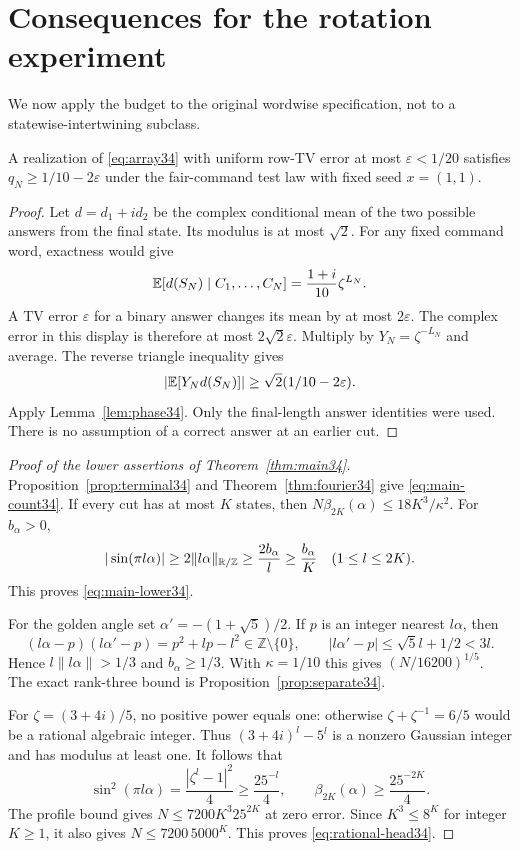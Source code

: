 \section{Consequences for the rotation experiment}\label{sec:rotation34}
We now apply the budget to the original wordwise specification, not to a
statewise-intertwining subclass.

\begin{proposition}\label{prop:terminal34}
A realization of \eqref{eq:array34} with uniform row-TV error at most
$\varepsilon<1/20$ satisfies $q_N\ge1/10-2\varepsilon$ under the fair-command
test law with fixed seed $x=(1,1)$.
\end{proposition}
\begin{proof}
Let $d=d_1+i d_2$ be the complex conditional mean of the two possible
answers from the final state. Its modulus is at most $\sqrt2$. For any
fixed command word, exactness would give
\[
 \mathbb E[d(S_N)\mid C_1,\ldots,C_N]
                  =\frac{1+i}{10}\zeta^{L_N}.
\]
A TV error $\varepsilon$ for a binary answer changes its mean by at most
$2\varepsilon$. The complex error in this display is therefore at most
$2\sqrt2\varepsilon$. Multiply by $Y_N=\zeta^{-L_N}$ and average. The reverse
triangle inequality gives
\[
 |\mathbb E[Y_Nd(S_N)]|\ge\sqrt2(1/10-2\varepsilon).
\]
Apply Lemma~\ref{lem:phase34}. Only the final-length answer identities
were used. There is no assumption of a correct answer at an earlier cut.
\end{proof}

\begin{proof}[Proof of the lower assertions of Theorem~\ref{thm:main34}]
Proposition~\ref{prop:terminal34} and Theorem~\ref{thm:fourier34} give
\eqref{eq:main-count34}. If every cut has at most $K$ states, then
$N\beta_{2K}(\alpha)\le18K^3/\kappa^2$. For $b_\alpha>0$,
\[
 |\sin(\pi l\alpha)|\ge2\|l\alpha\|_{\mathbb R/\mathbb Z}
          \ge\frac{2b_\alpha}{l}\ge\frac{b_\alpha}{K}
          \quad(1\le l\le2K).
\]
This proves \eqref{eq:main-lower34}.

For the golden angle set $\alpha'=-(1+\sqrt5)/2$. If $p$ is an integer
nearest $l\alpha$, then
\[
 (l\alpha-p)(l\alpha'-p)=p^2+lp-l^2\in\mathbb Z\setminus\{0\},
 \qquad |l\alpha'-p|\le\sqrt5l+1/2<3l.
\]
Hence $l\|l\alpha\|>1/3$ and $b_\alpha\ge1/3$. With $\kappa=1/10$
this gives $(N/16200)^{1/5}$. The exact rank-three bound is
Proposition~\ref{prop:separate34}.

For $\zeta=(3+4i)/5$, no positive power equals one: otherwise
$\zeta+\zeta^{-1}=6/5$ would be a rational algebraic integer. Thus
$(3+4i)^l-5^l$ is a nonzero Gaussian integer and has modulus at least one.
It follows that
\[
 \sin^2(\pi l\alpha)=\frac{|\zeta^l-1|^2}{4}\ge\frac{25^{-l}}4,
 \qquad \beta_{2K}(\alpha)\ge\frac{25^{-2K}}4.
\]
The profile bound gives $N\le7200K^3 25^{2K}$ at zero error. Since
$K^3\le8^K$ for integer $K\ge1$, it also gives
$N\le7200\,5000^K$. This proves \eqref{eq:rational-head34}.
\end{proof}

